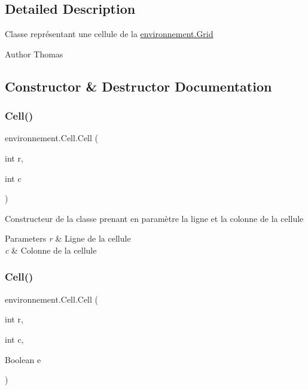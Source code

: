 \subsection{Detailed Description}
Classe représentant une cellule de la \hyperlink{classenvironnement_1_1_grid}{environnement.\+Grid} \begin{DoxyAuthor}{Author}
Thomas 
\end{DoxyAuthor}


\subsection{Constructor \& Destructor Documentation}
\hypertarget{classenvironnement_1_1_cell_ada829b1f91021c63aa07bea9f9f4285c}{}\label{classenvironnement_1_1_cell_ada829b1f91021c63aa07bea9f9f4285c} 
\subsubsection{\texorpdfstring{Cell()}{Cell()}\hspace{0.1cm}{\footnotesize\ttfamily [1/2]}}
{\footnotesize\ttfamily environnement.\+Cell.\+Cell (\begin{DoxyParamCaption}\item[{int}]{r,  }\item[{int}]{c }\end{DoxyParamCaption})}

Constructeur de la classe prenant en paramètre la ligne et la colonne de la cellule 
\begin{DoxyParams}{Parameters}
{\em r} & Ligne de la cellule \\
\hline
{\em c} & Colonne de la cellule \\
\hline
\end{DoxyParams}
\hypertarget{classenvironnement_1_1_cell_a811f3e78d96ea09509dd67cfd23cde66}{}\label{classenvironnement_1_1_cell_a811f3e78d96ea09509dd67cfd23cde66} 
\subsubsection{\texorpdfstring{Cell()}{Cell()}\hspace{0.1cm}{\footnotesize\ttfamily [2/2]}}
{\footnotesize\ttfamily environnement.\+Cell.\+Cell (\begin{DoxyParamCaption}\item[{int}]{r,  }\item[{int}]{c,  }\item[{Boolean}]{e }\end{DoxyParamCaption})}

